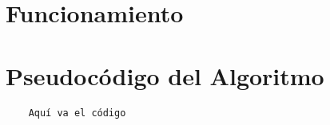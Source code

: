 \documentclass[a4paper,12pt]{article}
\begin{document}
\section*{Funcionamiento}



\section*{Pseudocódigo del Algoritmo}


\begin{verbatim}
    Aquí va el código 
\end{verbatim}

\end{document}
